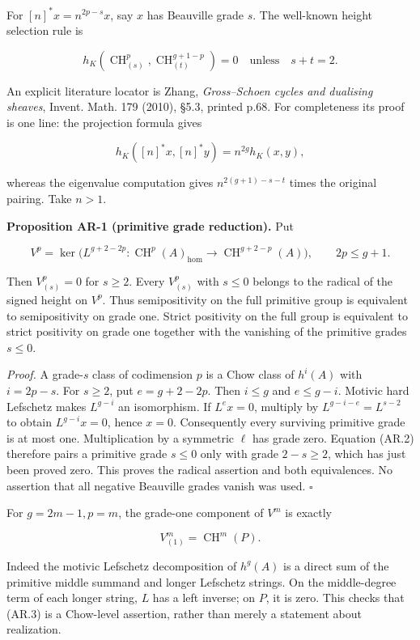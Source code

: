 \documentclass[11pt,a4paper]{article}
\begin{document}
For \([n]^*x=n^{2p-s}x\), say \(x\) has Beauville grade \(s\). The
well-known height selection rule is

\[
h_K(\operatorname{CH}^p_{(s)},\operatorname{CH}^{g+1-p}_{(t)})=0
\quad\text{unless}\quad s+t=2.
\tag{AR.2}
\]

An explicit literature locator is Zhang, \emph{Gross--Schoen cycles and
dualising sheaves}, Invent. Math. 179 (2010), §5.3, printed p.68. For
completeness its proof is one line: the projection formula gives

\[
h_K([n]^*x,[n]^*y)=n^{2g}h_K(x,y),
\]

whereas the eigenvalue computation gives \(n^{2(g+1)-s-t}\) times the
original pairing. Take \(n>1\).

\textbf{Proposition AR-1 (primitive grade reduction).} Put

\[
V^p=\ker\bigl(L^{g+2-2p}:\operatorname{CH}^p(A)_{\mathrm{hom}}
\longrightarrow\operatorname{CH}^{g+2-p}(A)\bigr),\qquad 2p\le g+1.
\]

Then \(V^p_{(s)}=0\) for \(s\ge2\). Every \(V^p_{(s)}\) with \(s\le0\)
belongs to the radical of the signed height on \(V^p\). Thus
semipositivity on the full primitive group is equivalent to
semipositivity on grade one. Strict positivity on the full group is
equivalent to strict positivity on grade one together with the vanishing
of the primitive grades \(s\le0\).

\emph{Proof.} A grade-\(s\) class of codimension \(p\) is a Chow class
of \(h^i(A)\) with \(i=2p-s\). For \(s\ge2\), put \(e=g+2-2p\). Then
\(i\le g\) and \(e\le g-i\). Motivic hard Lefschetz makes \(L^{g-i}\) an
isomorphism. If \(L^e x=0\), multiply by \(L^{g-i-e}=L^{s-2}\) to obtain
\(L^{g-i}x=0\), hence \(x=0\). Consequently every surviving primitive
grade is at most one. Multiplication by a symmetric \(\ell\) has grade
zero. Equation (AR.2) therefore pairs a primitive grade \(s\le0\) only
with grade \(2-s\ge2\), which has just been proved zero. This proves the
radical assertion and both equivalences. No assertion that all negative
Beauville grades vanish was used. \(\square\)

For \(g=2m-1,p=m\), the grade-one component of \(V^m\) is exactly

\[
V^m_{(1)}=\operatorname{CH}^m(P).
\tag{AR.3}
\]

Indeed the motivic Lefschetz decomposition of \(h^g(A)\) is a direct sum
of the primitive middle summand and longer Lefschetz strings. On the
middle-degree term of each longer string, \(L\) has a left inverse; on
\(P\), it is zero. This checks that (AR.3) is a Chow-level assertion,
rather than merely a statement about realization.
\end{document}
